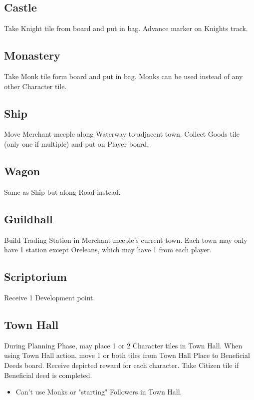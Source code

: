 \documentclass[8pt]{article}
\newenvironment{itemizeCustom}
{\begin{itemize}
  \setlength{\itemsep}{1pt}
  \setlength{\parskip}{0pt}
  \setlength{\parsep}{0pt}}
{\end{itemize}}
\begin{document}
\begin{multicols*}{2}
    \subsection*{Castle}
    Take Knight tile from board and put in bag. Advance marker on Knights track.

    \subsection*{Monastery}
    Take Monk tile form board and put in bag. Monks can be used instead of any other Character tile.

    \subsection*{Ship}
    Move Merchant meeple along Waterway to adjacent town. Collect Goods tile (only one if multiple) and put on Player board.

    \subsection*{Wagon}
    Same as Ship but along Road instead.

    \subsection*{Guildhall}
    Build Trading Station in Merchant meeple's current town. Each town may only have 1 station except Oreleans, which may have 1 from each player.
    
    \subsection*{Scriptorium}
    Receive 1 Development point.

    \subsection*{Town Hall}
    During Planning Phase, may place 1 or 2 Character tiles in Town Hall. When using Town Hall action, move 1 or both tiles from Town Hall Place to Beneficial Deeds board. Receive depicted reward for each character. Take Citizen tile if Beneficial deed is completed.
    \begin{itemizeCustom}
        \item Can't use Monks or "starting" Followers in Town Hall.
    \end{itemizeCustom}


\end{multicols*}
\end{document}

